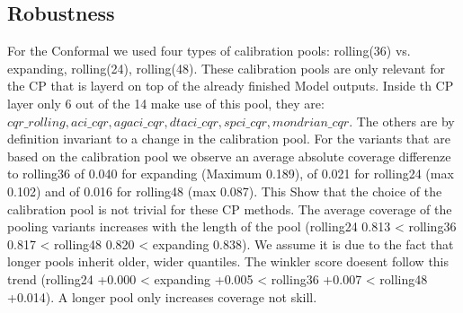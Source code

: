 \subsection{Robustness}
\label{sec:res:robustness}
For the Conformal we used four types of calibration pools: rolling(36) vs. expanding, rolling(24), rolling(48). These calibration pools are only relevant for the CP that is layerd on top of the already finished Model outputs. Inside th CP layer only 6 out of the 14 make use of this pool, they are: $cqr\_rolling, aci\_cqr, agaci\_cqr, dtaci\_cqr, spci\_cqr, mondrian\_cqr$. The others are by definition invariant to a change in the calibration pool. For the variants that are based on the calibration pool we observe an average absolute coverage differenze to rolling36 of 0.040 for expanding (Maximum 0.189), of 0.021 for rolling24 (max 0.102) and of 0.016 for rolling48 (max 0.087). This Show that the choice of the calibration pool is not trivial for these CP methods. The average coverage of the pooling variants increases with the length of the pool (rolling24 0.813 < rolling36 0.817 < rolling48 0.820 < expanding 0.838). We assume it is due to the fact that longer pools inherit older, wider quantiles. The winkler score doesent follow this trend (rolling24 +0.000 < expanding +0.005 < rolling36 +0.007 < rolling48 +0.014). A longer pool only increases coverage not skill.


